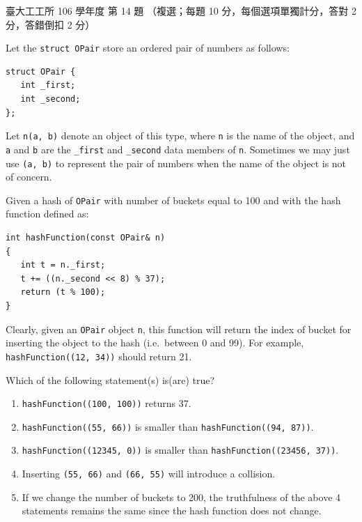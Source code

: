 \begin{pastexam}[label={px:ntu-106-ie-ds-14}]{臺大工工所 106 學年度 第 14 題}
（複選；每題 10 分，每個選項單獨計分，答對 2 分，答錯倒扣 2 分）

Let the \texttt{struct OPair} store an ordered pair of numbers as follows:
\begin{verbatim}
struct OPair {
   int _first;
   int _second;
};
\end{verbatim}
Let \texttt{n(a, b)} denote an object of this type, where \texttt{n} is the name of the object, and
\texttt{a} and \texttt{b} are the \texttt{\_first} and \texttt{\_second} data members of \texttt{n}.
Sometimes we may just use \texttt{(a, b)} to represent the pair of numbers when the name of the object
is not of concern.

Given a hash of \texttt{OPair} with number of buckets equal to 100 and with the hash function defined as:
\begin{verbatim}
int hashFunction(const OPair& n)
{
   int t = n._first;
   t += ((n._second << 8) % 37);
   return (t % 100);
}
\end{verbatim}
Clearly, given an \texttt{OPair} object \texttt{n}, this function will return the index of bucket for
inserting the object to the hash (i.e.\ between 0 and 99). For example, \texttt{hashFunction((12, 34))}
should return 21.

Which of the following statement(s) is(are) true?
\begin{enumerate}[label=(\Alph*),nosep]
\item \texttt{hashFunction((100, 100))} returns 37.
\item \texttt{hashFunction((55, 66))} is smaller than \texttt{hashFunction((94, 87))}.
\item \texttt{hashFunction((12345, 0))} is smaller than \texttt{hashFunction((23456, 37))}.
\item Inserting \texttt{(55, 66)} and \texttt{(66, 55)} will introduce a collision.
\item If we change the number of buckets to 200, the truthfulness of the above 4 statements remains the
same since the hash function does not change.
\end{enumerate}
\end{pastexam}

